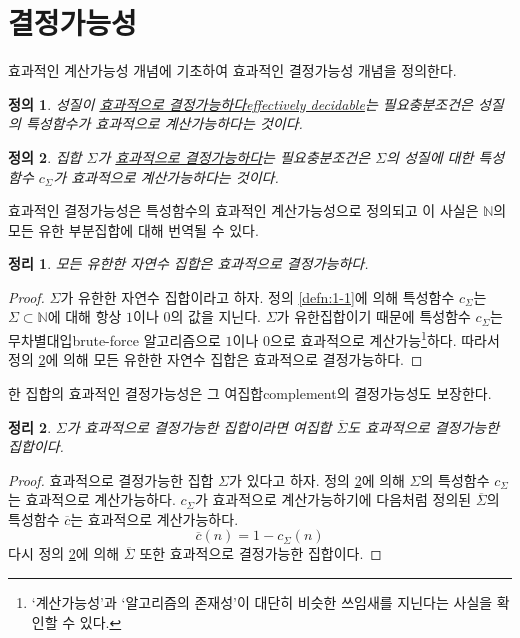 \documentclass[a4paper,chapter,atbegshi]{oblivoir}
\newtheorem{defn}{정의}[chapter]
\newtheorem{theo}{정리}[chapter]
\begin{document}
\section{결정가능성}
효과적인 계산가능성 개념에 기초하여 효과적인 결정가능성 개념을 정의한다.
\begin{defn}\label{defn:1-3}
  성질이 \underline{효과적으로 결정가능하다\tiny effectively decidable}는 
  필요충분조건은 성질의 특성함수가 효과적으로 계산가능하다는 것이다.
\end{defn}
\begin{defn}\label{defn:1-4}
  집합 $\Sigma$가 \underline{효과적으로 결정가능하다}는 필요충분조건은
  $\Sigma$의 성질에 대한 특성함수 $c_{\Sigma}$가 효과적으로 계산가능하다는
  것이다.
\end{defn}
효과적인 결정가능성은 특성함수의 효과적인 계산가능성으로 정의되고 이 사실은
$\mathbb{N}$의 모든 유한 부분집합에 대해 번역될 수 있다. 
\begin{theo}\label{theo:1-3}
  모든 유한한 자연수 집합은 효과적으로 결정가능하다.
\end{theo}
\begin{proof}
  $\Sigma$가 유한한 자연수 집합이라고 하자.
  정의 \ref{defn:1-1}에 의해 특성함수 $c_{\Sigma}$는 $\Sigma\subset\mathbb{N}$에
  대해 항상 $1$이나 $0$의 값을 지닌다. $\Sigma$가 유한집합이기 때문에 특성함수
  $c_{\Sigma}$는 무차별대입{\tiny brute-force} 알고리즘으로 $1$이나 $0$으로
  효과적으로 계산가능\footnote{`계산가능성'과 `알고리즘의 존재성'이 대단히 비슷한
  쓰임새를 지닌다는 사실을 확인할 수 있다.}하다. 따라서 정의 \ref{defn:1-4}에
  의해 모든 유한한 자연수 집합은 효과적으로 결정가능하다.
\end{proof}
한 집합의 효과적인 결정가능성은 그 여집합{\tiny complement}의 결정가능성도
보장한다.
\begin{theo}\label{theo:1-4}
  $\Sigma$가 효과적으로 결정가능한 집합이라면 여집합
  $\overline{\Sigma}$도 효과적으로 결정가능한 집합이다.
\end{theo}
\begin{proof}
  효과적으로 결정가능한 집합 $\Sigma$가 있다고 하자. 정의 \ref{defn:1-4}에 의해
  $\Sigma$의 특성함수 $c_{\Sigma}$는 효과적으로 계산가능하다. $c_{\Sigma}$가
  효과적으로 계산가능하기에 다음처럼 정의된  $\overline{\Sigma}$의 
  특성함수 $\overline{c}$는 효과적으로 계산가능하다.
  \[
    \overline{c}(n) = 1-c_{\Sigma}(n)
  \]
  다시 정의 \ref{defn:1-4}에 의해 $\overline{\Sigma}$ 또한 효과적으로 결정가능한
  집합이다.
\end{proof}
\end{document}
